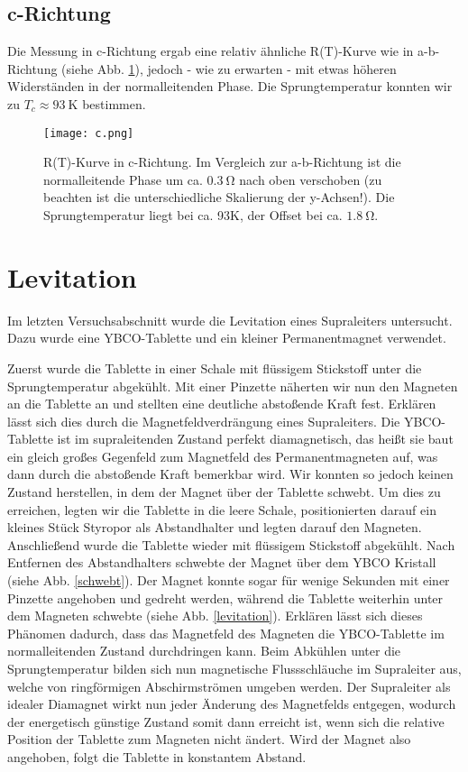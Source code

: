 \subsection{c-Richtung}
Die Messung in c-Richtung ergab eine relativ ähnliche R(T)-Kurve wie in a-b-Richtung (siehe Abb. \ref{c}), jedoch - wie zu erwarten - mit etwas höheren Widerständen in der normalleitenden Phase. Die Sprungtemperatur konnten wir zu $T_{c}\approx\SI{93}{\kelvin}$ bestimmen.

\begin{figure}[H]
	\begin{center}
		\texttt{[image: c.png]}
		\caption{R(T)-Kurve in c-Richtung. Im Vergleich zur a-b-Richtung ist die normalleitende Phase um ca. $\SI{0,3}{\ohm}$ nach oben verschoben (zu beachten ist die unterschiedliche Skalierung der y-Achsen!). Die Sprungtemperatur liegt bei ca. 93K, der Offset bei ca. $\SI{1,8}{\ohm}$. }
		\label{c}
	\end{center}
\end{figure} 
 
 
\section{Levitation}
Im letzten Versuchsabschnitt wurde die Levitation eines Supraleiters untersucht. Dazu wurde eine YBCO-Tablette und ein kleiner Permanentmagnet verwendet.

Zuerst wurde die Tablette in einer Schale mit flüssigem Stickstoff unter die Sprungtemperatur abgekühlt. Mit einer Pinzette näherten wir nun den Magneten an die Tablette an und stellten eine deutliche abstoßende Kraft fest. Erklären lässt sich dies durch die Magnetfeldverdrängung eines Supraleiters. Die YBCO-Tablette ist im supraleitenden Zustand perfekt diamagnetisch, das heißt sie baut ein gleich großes Gegenfeld zum Magnetfeld des Permanentmagneten auf, was dann durch die abstoßende Kraft bemerkbar wird. Wir konnten so jedoch keinen Zustand herstellen, in dem der Magnet über der Tablette schwebt. Um dies zu erreichen, legten wir die Tablette in die leere Schale, positionierten darauf ein kleines Stück Styropor als Abstandhalter und legten darauf den Magneten. Anschließend wurde die Tablette wieder mit flüssigem Stickstoff abgekühlt. Nach Entfernen des Abstandhalters schwebte der Magnet über dem YBCO Kristall (siehe Abb. \ref{schwebt}). Der Magnet konnte sogar für wenige Sekunden mit einer Pinzette angehoben und gedreht werden, während die Tablette weiterhin unter dem Magneten schwebte (siehe Abb. \ref{levitation}). Erklären lässt sich dieses Phänomen dadurch, dass das Magnetfeld des Magneten die YBCO-Tablette im normalleitenden Zustand durchdringen kann. Beim Abkühlen unter die Sprungtemperatur bilden sich nun magnetische Flussschläuche im Supraleiter aus, welche von ringförmigen Abschirmströmen umgeben werden. Der Supraleiter als idealer Diamagnet wirkt nun jeder Änderung des Magnetfelds entgegen, wodurch der energetisch günstige Zustand somit dann erreicht ist, wenn sich die relative Position der Tablette zum Magneten nicht ändert. Wird der Magnet also angehoben, folgt die Tablette in konstantem Abstand.

